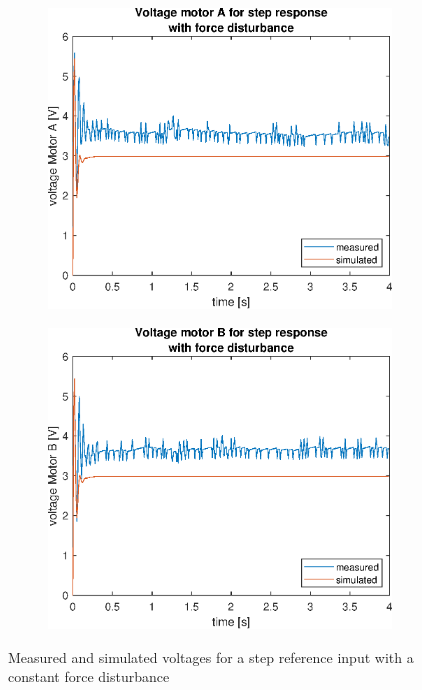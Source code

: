 \documentclass[a4paper,kul]{kulakarticle} %
\begin{document}
\begin{figure}[htp!]
	\centering
	\begin{subfigure}[b]{0.49\textwidth}
		\centering
		\includegraphics[width=\linewidth]{comparison_voltage_stepresponseA_FD.eps}
		
	\end{subfigure}
	\hfill
	\begin{subfigure}[b]{0.49\textwidth}  
		\centering
		\includegraphics[width=\linewidth]{comparison_voltage_stepresponseB_FD.eps}
		
	\end{subfigure}
	\caption{Measured and simulated voltages for a step reference input with a constant force disturbance}
	\label{fig:voltagestepresponseFD}
\end{figure}
\end{document}
